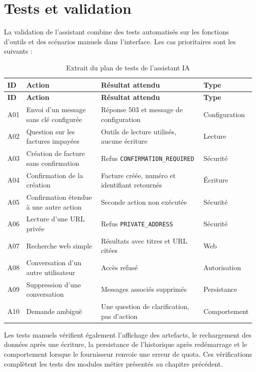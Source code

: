 \documentclass[12pt,a4paper,oneside]{report}
\newcommand{\code}[1]{\texttt{#1}}
\begin{document}
\section{Tests et validation}
La validation de l'assistant combine des tests automatisés sur les fonctions d'outils et des scénarios manuels dans l'interface. Les cas prioritaires sont les suivants :

\begin{longtable}{p{1.4cm}p{5.4cm}p{5.2cm}p{1.9cm}}
\caption{Extrait du plan de tests de l'assistant IA}\\
\toprule \textbf{ID} & \textbf{Action} & \textbf{Résultat attendu} & \textbf{Type}\\ \midrule
\endfirsthead
\toprule \textbf{ID} & \textbf{Action} & \textbf{Résultat attendu} & \textbf{Type}\\ \midrule
\endhead
A01 & Envoi d'un message sans clé configurée & Réponse 503 et message de configuration & Configuration\\
A02 & Question sur les factures impayées & Outils de lecture utilisés, aucune écriture & Lecture\\
A03 & Création de facture sans confirmation & Refus \code{\small CONFIRMATION\_REQUIRED} & Sécurité\\
A04 & Confirmation de la création & Facture créée, numéro et identifiant retournés & Écriture\\
A05 & Confirmation étendue à une autre action & Seconde action non exécutée & Sécurité\\
A06 & Lecture d'une URL privée & Refus \code{PRIVATE\_ADDRESS} & Sécurité\\
A07 & Recherche web simple & Résultats avec titres et URL citées & Web\\
A08 & Conversation d'un autre utilisateur & Accès refusé & Autorisation\\
A09 & Suppression d'une conversation & Messages associés supprimés & Persistance\\
A10 & Demande ambiguë & Une question de clarification, pas d'action & Comportement\\
\bottomrule
\end{longtable}

Les tests manuels vérifient également l'affichage des artefacts, le rechargement des données après une écriture, la persistance de l'historique après redémarrage et le comportement lorsque le fournisseur renvoie une erreur de quota. Ces vérifications complètent les tests des modules métier présentés au chapitre précédent.
\end{document}
